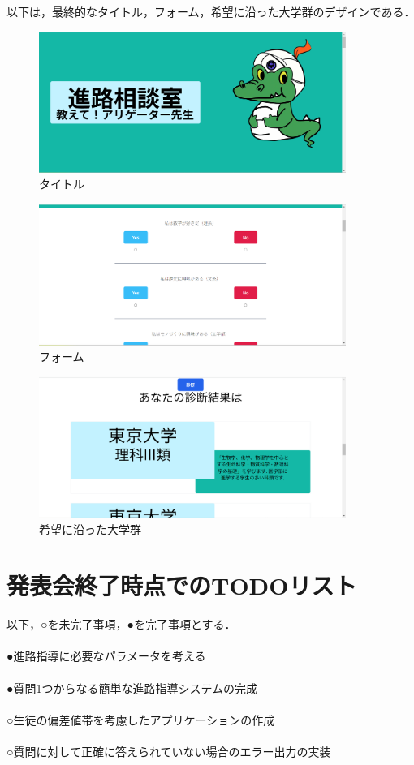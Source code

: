 \documentclass[a4j, titlepage]{jarticle}
\begin{document}
\begin{itemize}
以下は，最終的なタイトル，フォーム，希望に沿った大学群のデザインである．
\begin{figure}[htbp]
  \begin{center}
  \includegraphics[width=100mm]{title.png}
  \caption{タイトル}
  \end{center}
\end{figure}
\begin{figure}[htbp]
  \begin{center}
  \includegraphics[width=100mm]{form.png}
  \caption{フォーム}
  \end{center}
\end{figure}
\begin{figure}[htbp]
  \begin{center}
  \includegraphics[width=100mm]{univs.png}
  \caption{希望に沿った大学群}
  \end{center}
\end{figure}
\section{発表会終了時点でのTODOリスト}
以下，○を未完了事項，●を完了事項とする．\\
\\
●進路指導に必要なパラメータを考える\\
\\
●質問1つからなる簡単な進路指導システムの完成\\
\\
○生徒の偏差値帯を考慮したアプリケーションの作成\\
\\
○質問に対して正確に答えられていない場合のエラー出力の実装\\


\end{itemize}
\end{document}
